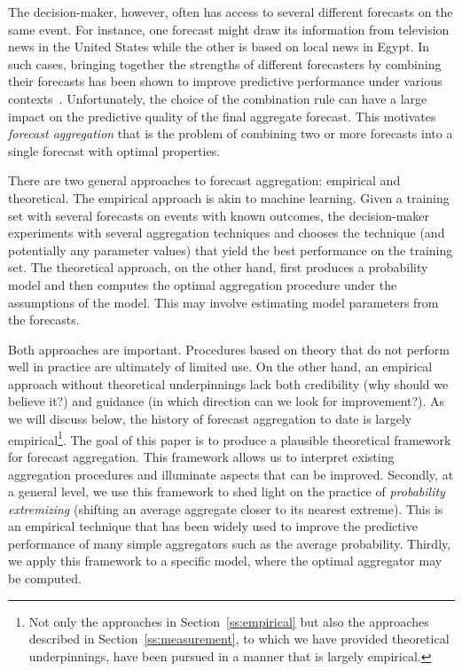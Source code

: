 \documentclass[11pt]{article}
\theoremstyle{definition}
\theoremstyle{definition}
\begin{document}
The decision-maker, however, often has access to several different forecasts on the same event. For instance, one forecast might draw its information from television news in the United States while the other is based on local news in Egypt. In such cases, bringing together the
strengths of different forecasters by combining their forecasts has been shown to improve predictive
performance under various contexts~\citep{clemen1989combining, armstrong2001combining}. Unfortunately, the choice of the combination rule can have a large impact on the predictive quality of the final aggregate forecast. 
This motivates \textit{forecast aggregation} that is the problem of combining two or more forecasts into a single forecast with optimal properties. 

There are two general approaches to forecast aggregation: empirical
and theoretical.  The empirical approach is akin to machine
learning. Given a training set with several forecasts on events with known outcomes, the decision-maker experiments with several aggregation techniques and chooses the technique (and potentially any parameter values) that yield the best performance on the training set. 
 The theoretical approach, on the other hand, first produces a probability
model and then computes the optimal aggregation procedure under the 
assumptions of the model.  This may involve estimating model parameters from the forecasts. 

Both approaches are important.  Procedures based on theory that
do not perform well in practice are ultimately of limited use.
On the other hand, an empirical approach without theoretical
underpinnings lack both credibility (why should we believe it?)
and guidance (in which direction can we look for improvement?).
As we will discuss below, the history of forecast aggregation
to date is largely empirical\footnote{Not only the approaches in
Section~\ref{ss:empirical} but also the approaches described in
Section~\ref{ss:measurement}, to which we have provided theoretical 
underpinnings, have been pursued in a manner that is largely empirical.}.  
The goal of this paper is to
produce a plausible theoretical framework for forecast aggregation.
This framework allows us to interpret existing aggregation 
procedures and illuminate aspects that can be improved.
Secondly, at a general level, we use this framework to shed light on 
the practice of {\em probability extremizing} (shifting an average aggregate closer to its nearest extreme). This is an empirical technique that has been widely used to improve the predictive performance of many simple aggregators such as the average probability. Thirdly, we apply
this framework to a specific model, where the optimal 
aggregator may be computed.
\end{document}
